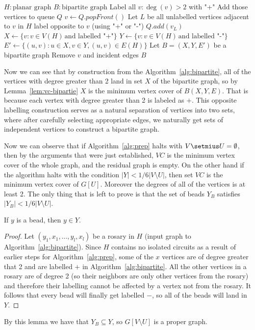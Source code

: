 \begin{algorithm}[H]
\caption{\textsc{BIPARTITE} procedure}
\label{alg:bipartite}
\small
\begin{algorithmic}[1]
    \Require $H \colon \text{planar graph}$
    \Ensure $B \colon \text{bipartite graph}$
    \State Label all $v : \deg(v) > 2$ with "+"
    \State Add those vertices to queue $Q$
    \State $v \gets Q.popFront()$
    \State Let $L$ be all unlabelled vertices adjacent to $v$ in $H$
        \State label opposite to $v$ (using "+" or "-")
        \State $Q.add(v_L)$
    \EndFor
    \EndWhile
    \State $X \gets \{ v : v \in V(H) \, \text{and labelled "+"}\}$
    \State $Y \gets \{ v : v \in V(H) \, \text{and labelled "-"}\}$
    \State $E' \gets \{(u, v) : u \in X, v \in Y, (u, v) \in E(H)\}$
    \State Let $B = (X, Y, E')$ be a bipartite graph
        \State Remove $v$ and incident edges
    \EndWhile
    \State \Return $B$
\end{algorithmic}
\end{algorithm}
        Now we can see that by construction from the Algorithm~\ref{alg:bipartite}, all of the vertices with degree 
        greater than 2 land in set $X$ of the bipartite graph, so by Lemma~\ref{lem:vc-bipartie} $X$ is the minimum 
        vertex cover of $B(X, Y, E)$. That is because each vertex with degree greater than 2 is labeled as $+$. This 
        opposite labelling construction serves as a natural separation of vertices into two sets, where after carefully
        selecting appropriate edges, we naturally get sets of independent vertices to construct a bipartite graph.

Now we can observe that if Algorithm~\ref{alg:prep} halts with $V \setmius U = \emptyset$, then by the arguments that were 
just established, $VC$ is the minimum vertex cover of the whole graph, and the residual graph is empty. On the other hand
if the algorithm halts with the condition $|Y| < 1/6 |V \setminus U|$, then set $VC$ is the minimum vertex cover of $G[U]$.
Moreover the degrees of all of the vertices is at least 2. The only thing that is left to prove is that the set of beads 
$Y_B$ satisfies $|Y_B| < 1/6 |V \setminus U|$.
\begin{lemma}
    If $y$ is a bead, then $y \in Y$.
\end{lemma}
\begin{proof}
    Let $(y_1, x_1, \dots, y_l, x_l)$ be a rosary in $H$ (input graph to Algorithm~\ref{alg:bipartite}). Since $H$
    contains no isolated circuits as a result of earlier steps for Algorithm~\ref{alg:prep}, some of the $x$ vertices 
    are of degree greater that 2 and are labelled $+$ in Algorithm~\ref{alg:bipartite}. All the other vertices in a rosary 
    are of degree 2 (so their neighbors are only other vertices from the rosary) and therefore their labelling cannot be
    affected by a vertex not from the rosary. It follows that every bead will finally get labelled $-$, so all of the beads will
    land in $Y$.
\end{proof}
By this lemma we have that $Y_B \subseteq Y$, so $G[V \setminus U]$ is a proper graph.

